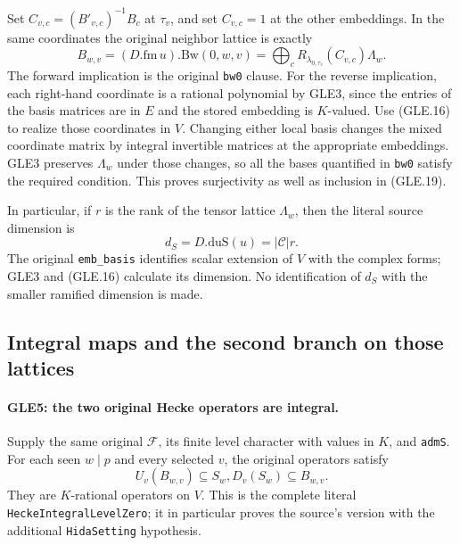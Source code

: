Set $C_{v,c}=(B'_{v,c})^{-1}B_c$ at $\tau_v$, and set $C_{v,c}=1$
at the other embeddings.  In the same coordinates the original
neighbor lattice is exactly
\[
 B_{w,v}=(D.\mathrm{fm}\,u).\mathrm{Bw}(0,w,v)
       =\bigoplus_c R_{\lambda_{0,\tau_v}}(C_{v,c})\Lambda_w.
 \tag{GLE.19}
\]
The forward implication is the original \texttt{bw0} clause.
For the reverse implication, each right-hand coordinate is a rational
polynomial by GLE3, since the entries of the basis matrices are in $E$
and the stored embedding is $K$-valued.  Use (GLE.16) to realize those
coordinates in $V$.  Changing either local basis changes the mixed
coordinate matrix by integral invertible matrices at the appropriate
embeddings.  GLE3 preserves $\Lambda_w$ under those changes, so all
the bases quantified in \texttt{bw0} satisfy the required condition.
This proves surjectivity as well as inclusion in (GLE.19).

In particular, if $r$ is the rank of the tensor lattice $\Lambda_w$,
then the literal source dimension is
\[
                  d_S=D.\mathrm{duS}(u)=|\mathcal C|r.
 \tag{GLE.20}
\]
The original \texttt{emb\_basis} identifies scalar extension of $V$
with the complex forms; GLE3 and (GLE.16) calculate its dimension.
No identification of $d_S$ with the smaller ramified dimension is made.

\subsection{Integral maps and the second branch on those lattices}

\paragraph{GLE5: the two original Hecke operators are integral.}
\label{claim:GLE5}
Supply the same original $\mathcal F$, its finite level character with
values in $K$, and \texttt{admS}.  For each seen $w\mid p$ and every
selected $v$, the original operators satisfy
\[
              U_v(B_{w,v})\subseteq S_w,
              D_v(S_w)\subseteq B_{w,v}.           \tag{GLE.21}
\]
They are $K$-rational operators on $V$.  This is the complete literal
\texttt{HeckeIntegralLevelZero}; it in particular proves the
source's version with the additional \texttt{HidaSetting} hypothesis.

